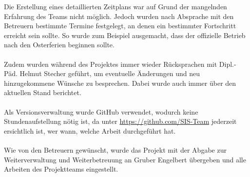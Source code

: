 Die Erstellung eines detaillierten Zeitplans war auf Grund der mangelnden Erfahrung des Teams nicht möglich. Jedoch wurden nach Absprache mit den Betreuern bestimmte Termine festgelegt, an denen ein bestimmter Fortschritt erreicht sein sollte. So wurde zum Beispiel ausgemacht, dass der offizielle Betrieb nach den Osterferien beginnen sollte.\\\\
Zudem wurden während  des Projektes immer wieder Rücksprachen mit Dipl.-Päd. Helmut Stecher geführt, um eventuelle Änderungen und neu hinzugekommene Wünsche zu besprechen. Dabei wurde auch immer über den aktuellen Stand berichtet.\\\\
Als Versionsverwaltung wurde GitHub verwendet, wodurch keine Stundenaufstellung nötig ist, da unter  \href{https://github.com/SIS-Team}{https://github.com/SIS-Team} jederzeit ersichtlich ist, wer wann, welche Arbeit durchgeführt hat.\\\\
Wie von den Betreuern gewünscht, wurde das Projekt mit der Abgabe zur Weiterverwaltung und Weiterbetreuung an Gruber Engelbert übergeben und alle Arbeiten des Projektteams eingestellt.
